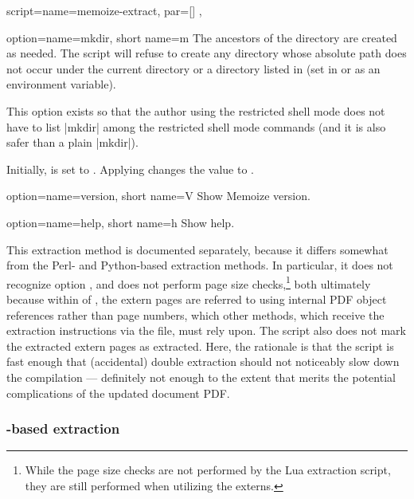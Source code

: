\documentclass[a4paper,11pt]{article}
\begin{document}
\begin{doc}{
    script={name=memoize-extract, par=[] },
  }
\begin{doc}{
      option={name=mkdir, short name=m}
    }
    The ancestors of the directory are created as needed.  The script will
    refuse to create any directory whose absolute path does not occur under the
    current directory or a directory listed in  (set in
     or as an environment variable).

    This option exists so that the author using the restricted shell mode does
    not have to list |mkdir| among the restricted shell mode commands (and it
    is also safer than a plain |mkdir|).

    Initially,  is set to
    .  Applying
     changes the value to
    .
  \end{doc}
  \begin{doc}{
      option={name=version, short name=V}
    }
    Show Memoize version.
  \end{doc}
  \begin{doc}{
      option={name=help, short name=h}
    }
    Show help.
  \end{doc}

  This extraction method is documented separately, because it differs somewhat
  from the Perl- and Python-based extraction methods.  In particular, it does
  not recognize option , and does not
  perform page size checks,\footnote{While the page size checks are not
    performed by the Lua extraction script, they are still performed when
    utilizing the externs.} both ultimately because within
   of , the extern pages are
  referred to using internal PDF object references rather than page numbers,
  which other methods, which receive the extraction instructions via the \dmmz
  file, must rely upon.  The script also does not mark the extracted extern
  pages as extracted.  Here, the rationale is that the script is fast enough
  that (accidental) double extraction should not noticeably slow down the
  compilation --- definitely not enough to the extent that merits the potential
  complications of the updated document PDF.
  
\end{doc}

\subsubsection{\texorpdfstring{}{TeX}-based extraction}
\label{sec:ref:extraction-tex}
\end{document}

